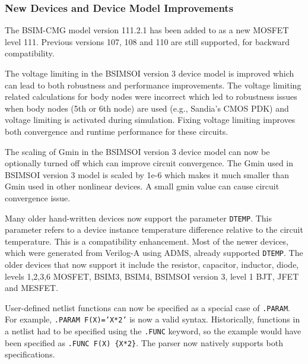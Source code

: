 \documentclass[letterpaper]{scrartcl}
\begin{document}
\subsubsection*{New Devices and Device Model Improvements}
\begin{XyceItemize}

\item The BSIM-CMG model version 111.2.1 has been added to \Xyce{} as a new MOSFET level 111.  Previous versions 107, 108 and 110 are still supported, for backward compatibility.

\item The voltage limiting in the BSIMSOI version 3 device model is
improved which can lead to both robustness and performance improvements.
The voltage limiting related calculations for body nodes were incorrect 
which led to robustness issues when body nodes (5th or 6th node) are
used (e.g., Sandia's CMOS PDK) and voltage limiting is activated during
simulation. Fixing voltage limiting improves both convergence
and runtime performance for these circuits.

\item The scaling of Gmin in the BSIMSOI version 3 device model can now
be optionally turned off which can improve circuit convergence. The Gmin
used in BSIMSOI version 3 model is scaled by 1e-6 which makes it much smaller than
Gmin used in other nonlinear devices. A small gmin value can cause circuit
convergence issue.

\item Many older hand-written devices now support the parameter \texttt{DTEMP}.  This 
parameter refers to a device instance temperature difference relative to the 
circuit temperature.  This is a compatibility enhancement.  Most of the newer devices,
which were generated from Verilog-A using ADMS, already supported \texttt{DTEMP}.  
The older devices that now support it include the resistor, capacitor, 
inductor, diode, levels 1,2,3,6 MOSFET, BSIM3, BSIM4, BSIMSOI version 3, level 1 BJT, 
JFET and MESFET.

\item User-defined netlist functions can now be specified as a special 
case of \texttt{.PARAM}.  For example, \texttt{.PARAM F(X)='X*2'} is now a 
valid \Xyce{} syntax.  Historically, functions in a \Xyce{} netlist had 
to be specified using the \texttt{.FUNC} keyword, so the example would have 
been specified as \texttt{.FUNC F(X) \{X*2\}}.
The parser now natively supports both specifications.   


\end{XyceItemize}
\end{document}
